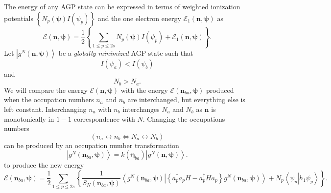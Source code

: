 \documentclass[aps,preprint]{revtex4}%
\begin{document}
The energy of any AGP state can be expressed in terms of weighted ionization
potentials $\left\{  N_{p}\left(  \mathbf{\psi}\right)  I\left(  \psi
_{p}\right)  \right\}  $ and the one electron energy $\mathcal{E}_{1}\left(
\mathbf{n},\mathbf{\psi}\right)  $ as
\begin{equation}
\mathcal{E}\left(  \mathbf{n},\mathbf{\psi}\right)  =\frac{1}{2}\left\{
\sum_{1\leq p\leq2s}N_{p}\left(  \mathbf{\psi}\right)  I\left(  \psi
_{p}\right)  +\mathcal{E}_{1}\left(  \mathbf{n},\mathbf{\psi}\right)
\right\}  .
\end{equation}
Let $\left\vert g^{N}\left(  \mathbf{n},\mathbf{\psi}\right)  \right\rangle $
be a \emph{globally minimized }AGP state such that \emph{\ }
\begin{equation}
I\left(  \psi_{a}\right)  <I\left(  \psi_{b}\right)
\end{equation}
and
\begin{equation}
N_{b}>N_{a}.
\end{equation}
We will compare the energy $\mathcal{E}\left(  \mathbf{n},\mathbf{\psi
}\right)  $ with the energy $\mathcal{E}\left(  \mathbf{n}_{ba},\mathbf{\psi
}\right)  $ produced when the occupation numbers $n_{a}$ and $n_{b}$ are
interchanged, but everything else is left constant. Interchanging $n_{a}$ with
$n_{b}$ interchanges $N_{a}$ and $N_{b}$ as $\mathbf{n}$ is monotonically in
$1-1$ correspondence with $N$. Changing the occupations numbers
\begin{equation}
\left(  n_{a}\leftrightarrow n_{b}\Leftrightarrow N_{a}\leftrightarrow
N_{b}\right)
\end{equation}
can be produced by an occupation number transformation
\begin{equation}
\left\vert g^{N}\left(  \mathbf{n}_{ba},\mathbf{\psi}\right)  \right\rangle
=k\left(  \mathbf{\eta}_{ba}\right)  \left\vert g^{N}\left(  \mathbf{n}%
,\mathbf{\psi}\right)  \right\rangle .
\end{equation}
to produce the new energy
\begin{equation}
\mathcal{E}\left(  \mathbf{n}_{ba},\mathbf{\psi}\right)  =\frac{1}{2}%
{\textstyle\sum\limits_{1\leq p\leq2s}}
\left\{  \frac{1}{S_{N}\left(  \mathbf{n}_{ba},\mathbf{\psi}\right)
}\left\langle \left.  g^{N}\left(  \mathbf{n}_{ba},\mathbf{\psi}\right)
\right\vert \left\{  a_{p}^{\dagger}a_{p}H-a_{p}^{\dagger}Ha_{p}\right\}
g^{N}\left(  \mathbf{n}_{ba},\mathbf{\psi}\right)  \right\rangle
+N_{p}\left\langle \left.  \psi_{p}\right\vert h_{1}\psi_{p}\right\rangle
\right\}  .\label{enba}%
\end{equation}
\end{document}
